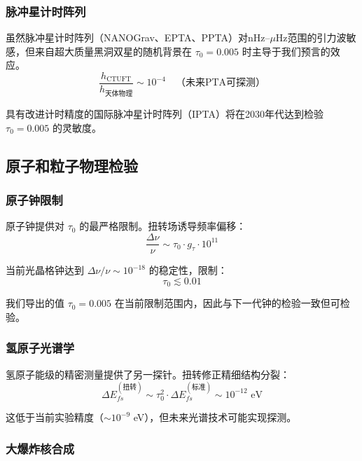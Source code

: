 \subsubsection{脉冲星计时阵列}

虽然脉冲星计时阵列（NANOGrav、EPTA、PPTA）对nHz--$\mu$Hz范围的引力波敏感，但来自超大质量黑洞双星的随机背景在 $\tau_0 = 0.005$ 时主导于我们预言的效应。
\begin{equation}
    \frac{h_{\text{CTUFT}}}{h_{\text{天体物理}}} \sim 10^{-4} \quad \text{（未来PTA可探测）}
\end{equation}

具有改进计时精度的国际脉冲星计时阵列（IPTA）将在2030年代达到检验 $\tau_0 = 0.005$ 的灵敏度。

\subsection{原子和粒子物理检验}

\subsubsection{原子钟限制}

原子钟提供对 $\tau_0$ 的最严格限制。扭转场诱导频率偏移：
\begin{equation}
    \frac{\Delta \nu}{\nu} \sim \tau_0 \cdot g_\tau \cdot 10^{11}
\end{equation}

当前光晶格钟达到 $\Delta\nu/\nu \sim 10^{-18}$ 的稳定性，限制：
\begin{equation}
    \tau_0 \lesssim 0.01
\end{equation}

我们导出的值 $\tau_0 = 0.005$ 在当前限制范围内，因此与下一代钟的检验一致但可检验。

\subsubsection{氢原子光谱学}

氢原子能级的精密测量提供了另一探针。扭转修正精细结构分裂：
\begin{equation}
    \Delta E_{fs}^{(\text{扭转})} \sim \tau_0^2 \cdot \Delta E_{fs}^{(\text{标准})} \sim 10^{-12} \text{ eV}
\end{equation}

这低于当前实验精度（$\sim 10^{-9}$ eV），但未来光谱技术可能实现探测。

\subsubsection{大爆炸核合成}

